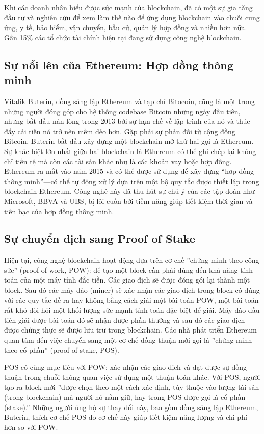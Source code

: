 \documentclass[12pt,a4paper]{article}
\begin{document}
Khi các doanh nhân hiểu được sức mạnh của blockchain, đã có một sự gia tăng đầu tư và nghiên cứu để xem làm thế nào để ứng dụng blockchain vào chuỗi cung ứng, y tế, bảo hiểm, vận chuyển, bầu cử, quản lý hợp đồng và nhiều hơn nữa. Gần 15\% các tổ chức tài chính hiện tại đang sử dụng công nghệ blockchain. 

\subsection{Sự nổi lên của Ethereum: Hợp đồng thông minh}

Vitalik Buterin, đồng sáng lập  Ethereum và tạp chí Bitocoin, cũng là một trong những người đóng góp cho hệ thống codebase Bitcoin những ngày đầu tiên, nhưng bắt đầu nản lòng trong  2013 bởi sự hạn chế về lập trình của nó và thúc đẩy cải tiến nó trở nên mềm dẻo hơn. Gặp phải sự phản đối từ cộng đồng Bitcoin, Buterin bắt đầu xây dựng một blockchain mở thứ hai gọi là Ethereum. Sự khác biệt lớn nhất giữa hai blockchain là Ethereum có thể ghi chép lại không chỉ tiền tệ mà còn các tài sản khác như là các khoản vay hoặc hợp đồng. Ethereum ra mắt vào năm 2015 và có thể được sử dụng để xây dựng “hơp đồng thông minh”—có thể tự động xử lý dựa trên một bộ quy tắc được thiết lập trong blockchain Ethereum. Công nghê này đã thu hút sự chú ý của các tập đoàn như Microsoft, BBVA và UBS, bị lôi cuốn bởi tiềm năng giúp tiết kiệm thời gian và tiền bạc của hợp đồng thông minh.

\subsection{Sự chuyển dịch sang Proof of Stake}

Hiện tại, công nghệ blockchain hoạt động dựa trên cơ chế ''chứng minh theo công sức'' (proof of work, POW): để tạo một block cần phải dùng đến khả năng tính toán của một máy tính đắc tiền. Các giao địch sẽ được đóng gói lại thành một block. Sau đó các máy đào (miner) sẽ xác nhận các giao dịch trong block có đúng với các quy tắc đề ra hay không bằng cách giải một bài toán POW, một bài toán rất khó đòi hỏi một khối lượng sức mạnh tính toán đặc biệt để giải. Máy đào đầu tiên giải được bài toán đó sẽ nhận được phần thưởng và sau đó các giao dịch được chứng thực sẽ được lưu trữ trong blockchain. Các nhà phát triển Ethereum quan tâm đến việc chuyển sang một cơ chế đồng thuận mới gọi là ''chứng minh theo cổ phần'' (proof of stake, POS).

POS có  cùng mục tiêu với POW: xác nhận các giao dịch và đạt được sự đồng thuận trong chuỗi thông quan việc sử dụng một thuận toán khác.  Với POS, người tạo ra block mới ''được chọn theo một cách xác định, tùy thuộc vào lượng tài sản (trong blockchain) mà người nó nắm giữ, hay trong POS được gọi là cổ phần (stake).''  Những người ủng hộ sự thay đổi này, bao gồm đồng sáng lập Ethereum, Buterin, thích cơ chế POS do cơ chế này giúp tiết kiệm năng lượng và chi phí hơn so với POW.
\end{document}
